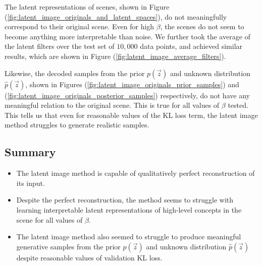 The latent representations of scenes, shown in Figure (\ref{fig:latent_image_originals_and_latent_spaces}), do not meaningfully correspond to their original scene. Even for high $\beta$, the scenes do not seem to become anything more interpretable than noise. We further took the average of the latent filters over the test set of $10,000$ data points, and achieved similar results, which are shown in Figure (\ref{fig:latent_image_average_filters}).

Likewise, the decoded samples from the prior $p(\vec{z})$ and unknown distribution $\hat{p}(\vec{z})$, shown in Figures (\ref{fig:latent_image_originals_prior_samples}) and (\ref{fig:latent_image_originals_posterior_samples}) respectively, do not have any meaningful relation to the original scene. This is true for all values of $\beta$ tested. This tells us that even for reasonable values of the KL loss term, the latent image method struggles to generate realistic samples.

\subsection{Summary}
\begin{itemize}
\item The latent image method is capable of qualitatively perfect reconstruction of its input.
\item Despite the perfect reconstruction, the method seems to struggle with learning interpretable latent representations of high-level concepts in the scene for all values of $\beta$.
\item The latent image method also seemed to struggle to produce meaningful generative samples from the prior $p(\vec{z})$ and unknown distribution $\hat{p}(\vec{z})$ despite reasonable values of validation KL loss.
\end{itemize}


